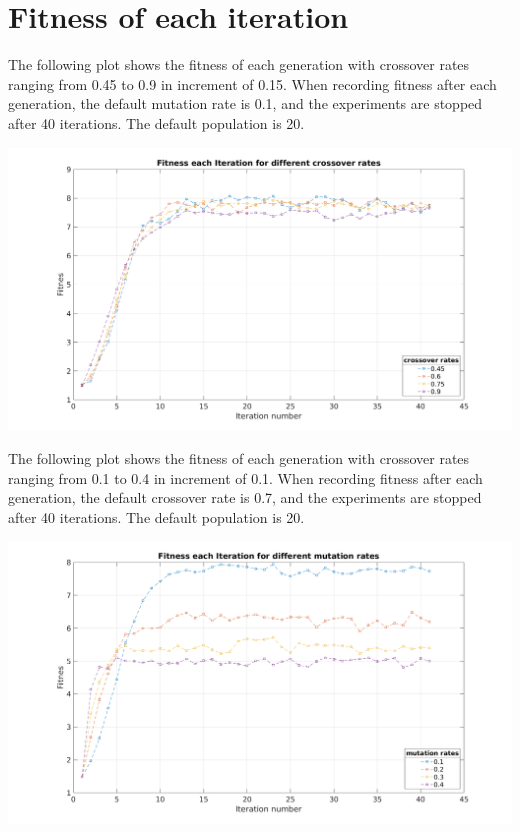 \documentclass[paper=a4, fontsize=11pt]{scrartcl} %
\begin{document}
    \section{Fitness of each iteration}

    The following plot shows the fitness of each generation with crossover rates ranging from 0.45 to 0.9 in increment of 0.15. When recording fitness after each generation, the default mutation rate is 0.1, and the experiments are stopped after 40 iterations. The default population is 20.

    \includegraphics[width=\linewidth]{a1-onemax-crossover_fitness}

    \pagebreak

    The following plot shows the fitness of each generation with crossover rates ranging from 0.1 to 0.4 in increment of 0.1. When recording fitness after each generation, the default crossover rate is 0.7, and the experiments are stopped after 40 iterations. The default population is 20.

    \includegraphics[width=\linewidth]{a1-onemax-mutation_fitness}
\end{document}
